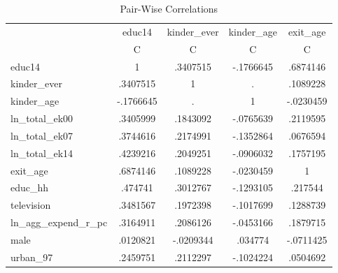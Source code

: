 \begin{table}[!h]
\caption{Pair-Wise Correlations}
\begin{tabular}{lllll}
\cline{1-5}
\multicolumn{1}{c}{} &
  \multicolumn{1}{|c}{educ14} &
  \multicolumn{1}{c}{kinder\_ever} &
  \multicolumn{1}{c}{kinder\_age} &
  \multicolumn{1}{c}{exit\_age} \\
\multicolumn{1}{c}{} &
  \multicolumn{1}{|c}{C} &
  \multicolumn{1}{c}{C} &
  \multicolumn{1}{c}{C} &
  \multicolumn{1}{c}{C} \\
\cline{1-5}
\multicolumn{1}{l}{educ14} &
  \multicolumn{1}{|c}{1} &
  \multicolumn{1}{c}{.3407515} &
  \multicolumn{1}{c}{-.1766645} &
  \multicolumn{1}{c}{.6874146} \\
\multicolumn{1}{l}{kinder\_ever} &
  \multicolumn{1}{|c}{.3407515} &
  \multicolumn{1}{c}{1} &
  \multicolumn{1}{c}{.} &
  \multicolumn{1}{c}{.1089228} \\
\multicolumn{1}{l}{kinder\_age} &
  \multicolumn{1}{|c}{-.1766645} &
  \multicolumn{1}{c}{.} &
  \multicolumn{1}{c}{1} &
  \multicolumn{1}{c}{-.0230459} \\
\multicolumn{1}{l}{ln\_total\_ek00} &
  \multicolumn{1}{|c}{.3405999} &
  \multicolumn{1}{c}{.1843092} &
  \multicolumn{1}{c}{-.0765639} &
  \multicolumn{1}{c}{.2119595} \\
\multicolumn{1}{l}{ln\_total\_ek07} &
  \multicolumn{1}{|c}{.3744616} &
  \multicolumn{1}{c}{.2174991} &
  \multicolumn{1}{c}{-.1352864} &
  \multicolumn{1}{c}{.0676594} \\
\multicolumn{1}{l}{ln\_total\_ek14} &
  \multicolumn{1}{|c}{.4239216} &
  \multicolumn{1}{c}{.2049251} &
  \multicolumn{1}{c}{-.0906032} &
  \multicolumn{1}{c}{.1757195} \\
\multicolumn{1}{l}{exit\_age} &
  \multicolumn{1}{|c}{.6874146} &
  \multicolumn{1}{c}{.1089228} &
  \multicolumn{1}{c}{-.0230459} &
  \multicolumn{1}{c}{1} \\
\multicolumn{1}{l}{educ\_hh} &
  \multicolumn{1}{|c}{.474741} &
  \multicolumn{1}{c}{.3012767} &
  \multicolumn{1}{c}{-.1293105} &
  \multicolumn{1}{c}{.217544} \\
\multicolumn{1}{l}{television} &
  \multicolumn{1}{|c}{.3481567} &
  \multicolumn{1}{c}{.1972398} &
  \multicolumn{1}{c}{-.1017699} &
  \multicolumn{1}{c}{.1288739} \\
\multicolumn{1}{l}{ln\_agg\_expend\_r\_pc} &
  \multicolumn{1}{|c}{.3164911} &
  \multicolumn{1}{c}{.2086126} &
  \multicolumn{1}{c}{-.0453166} &
  \multicolumn{1}{c}{.1879715} \\
\multicolumn{1}{l}{male} &
  \multicolumn{1}{|c}{.0120821} &
  \multicolumn{1}{c}{-.0209344} &
  \multicolumn{1}{c}{.034774} &
  \multicolumn{1}{c}{-.0711425} \\
\multicolumn{1}{l}{urban\_97} &
  \multicolumn{1}{|c}{.2459751} &
  \multicolumn{1}{c}{.2112297} &
  \multicolumn{1}{c}{-.1024224} &
  \multicolumn{1}{c}{.0504692} \\
\cline{1-5}
\end{tabular}
\end{table}
